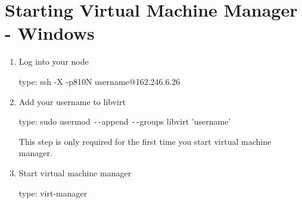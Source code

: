 \section*{Starting Virtual Machine Manager - Windows}

\begin{enumerate}
\item Log into your node

type: ssh -X -p810N username@162.246.6.26\\

\item Add your username to libvirt

type: sudo usermod \texttt{-{}-}append \texttt{-{}-}groups libvirt 'username'

This step is only required for the first time you start virtual machine manager.\\

\item Start virtual machine manager

type: virt-manager

\end{enumerate}
